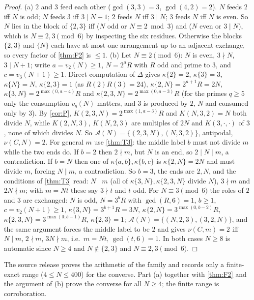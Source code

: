 \begin{proof}
(a) $2$ and $3$ feed each other ($\gcd(3,3)=3$, $\gcd(4,2)=2$). $N$ feeds $2$ iff $N$ is odd; $N$ feeds $3$ iff $3\mid N+1$; $2$ feeds $N$ iff $3\mid N$; $3$ feeds $N$ iff $N$ is even. So $N$ lies in the block of $\{2,3\}$ iff ($N$ odd or $N\equiv2\bmod3$) and ($N$ even or $3\mid N$), which is $N\equiv2,3\pmod 6$ by inspecting the six residues. Otherwise the blocks $\{2,3\}$ and $\{N\}$ each have at most one arrangement up to an adjacent exchange, so every factor of \cref{thm:F2} is $\le1$.
(b) Let $N\equiv2\pmod 6$: $N$ is even, $3\nmid N$, $3\mid N+1$; write $a=v_2(N)\ge1$, $N=2^aR$ with $R$ odd and prime to $3$, and $c=v_3(N+1)\ge1$. Direct computation of $\Delta$ gives $\kappa\{2\}=2$, $\kappa\{3\}=3$, $\kappa\{N\}=N$, $\kappa\{2,3\}=1$ (as $R(2)R(3)=24$), $\kappa\{2,N\}=2^{a+1}R=2N$, $\kappa\{3,N\}=2^{\max(0,a-4)}R$ and $\kappa\{2,3,N\}=2^{\max(0,a-3)}R$ (for the primes $q\ge5$ only the consumption $v_q(N)$ matters, and $3$ is produced by $2$, $N$ and consumed only by $3$). By \cref{cor:P}, $K(2,3,N)=2^{\max(1,a-3)}R$ and $K(N,3,2)=N$ both divide $N$, while $K(2,N,3)$, $K(N,2,3)$ are multiples of $2N$ and $K(3,\cdot,\cdot)$ of $3$, none of which divides $N$. So $\mathcal A(N)=\{(2,3,N),(N,3,2)\}$, antipodal, $\nu(C,N)=2$. For general $m$ use \cref{thm:T3}: the middle label $b$ must not divide $m$ while the two ends do. If $b=2$ then $2\nmid m$, but $N$ is an end, so $2\mid N\mid m$, a contradiction. If $b=N$ then one of $\kappa\{a,b\},\kappa\{b,c\}$ is $\kappa\{2,N\}=2N$ and must divide $m$, forcing $N\mid m$, a contradiction. So $b=3$, the ends are $2,N$, and the conditions of \cref{thm:T3} read: $N\mid m$ (all of $\kappa\{3,N\},\kappa\{2,3,N\}$ divide $N$), $3\nmid m$ and $2N\nmid m$; with $m=Nt$ these say $3\nmid t$ and $t$ odd.
For $N\equiv3\pmod6$ the roles of $2$ and $3$ are exchanged: $N$ is odd, $N=3^bR$ with $\gcd(R,6)=1$, $b\ge1$, $c=v_2(N+1)\ge1$, $\kappa\{3,N\}=3^{b+1}R=3N$, $\kappa\{2,N\}=3^{\max(0,b-2)}R$, $\kappa\{2,3,N\}=3^{\max(0,b-1)}R$, $\kappa\{2,3\}=1$; $\mathcal A(N)=\{(N,2,3),(3,2,N)\}$, and the same argument forces the middle label to be $2$ and gives $\nu(C,m)=2$ iff $N\mid m$, $2\nmid m$, $3N\nmid m$, i.e.\ $m=Nt$, $\gcd(t,6)=1$. In both cases $N\ge8$ is automatic since $N\ge4$ and $N\notin\{2,3\}$ and $N\equiv2,3\pmod 6$.
\end{proof}
\begin{remark}
The source release proves the arithmetic of the family and records only a finite-exact range ($4\le N\le400$) for the converse. Part (a) together with \cref{thm:F2} and the argument of (b) prove the converse for all $N\ge4$; the finite range is corroboration.
\end{remark}
